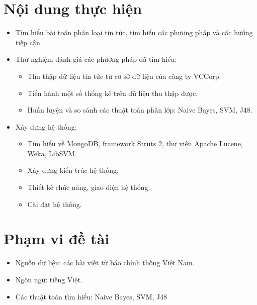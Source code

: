 \section{Nội dung thực hiện}
	\begin{itemize}
		\item Tìm hiểu bài toán phân loại tin tức, tìm hiểu các phương pháp và các hướng tiếp cận
		\item Thử nghiệm đánh giá các phương pháp đã tìm hiểu:
		\begin{itemize}
			\item Thu thập dữ liệu tin tức từ cơ sở dữ liệu của công ty VCCorp.
			\item Tiến hành một số thống kê trên dữ liệu thu thập được.
			\item Huấn luyện và so sánh các thuật toán phân lớp: Naive Bayes, SVM, J48.
		\end{itemize}
	
		\item Xây dựng hệ thống:
		\begin{itemize}
			\item Tìm hiểu về MongoDB, framework Struts 2, thư viện Apache Lucene, Weka, LibSVM.
			\item Xây dựng kiến trúc hệ thống.
			\item Thiết kế chức năng, giao diện hệ thống.
			\item Cài đặt hệ thống.
		\end{itemize}
		
	\end{itemize}

\section{Phạm vi đề tài}
\begin{itemize}
	\item Nguồn dữ liệu: các bài viết từ báo chính thống Việt Nam.
	\item Ngôn ngữ: tiếng Việt.
	\item Các thuật toán tìm hiểu: Naive Bayes, SVM, J48
\end{itemize}


